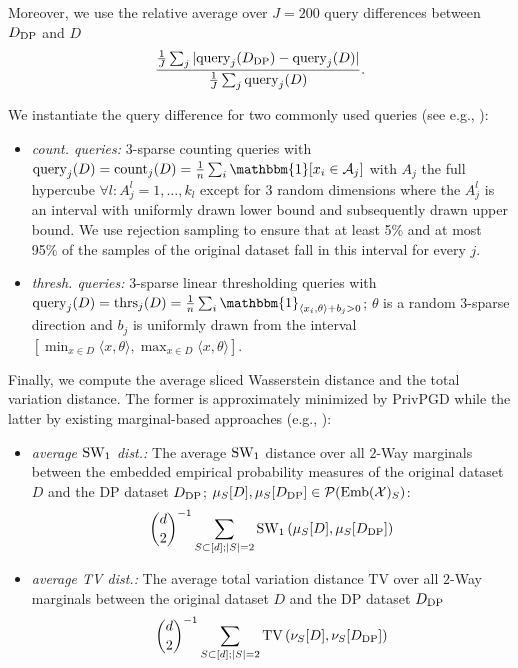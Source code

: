 Moreover, we use the relative average over $J =200$  query differences between $D_{\text{DP}}$ and $D$
    \begin{equation}
    \label{eq:countquery}
      \frac{ \frac{1}{J}\sum_j\vert \text{query}_j(D_{\text{DP}}) - \text{query}_j(D)\vert }{  \frac{1}{J}\sum_j \text{query}_j(D)}.
    \end{equation}
    

We instantiate the query difference 
for two commonly used queries (see e.g., \cite{vietri2022private}):
    \begin{itemize}
        \item[3.] \textit{count. queries:} $3$-sparse counting queries 
with $\text{query}_j(D)= \text{count}_j(D) = \frac{1}{n} \sum_i 
\mathbbm{1}[x_i \in \mathcal A_j] $  with  $A_j$ the full hypercube $\forall l: A_j^l = {1, \dots, k_l}$ except for $3$ random dimensions where the $A_j^l$ is an interval with uniformly drawn lower bound and subsequently drawn upper bound. We use rejection sampling to ensure that at least 5\% and at most 95\% of the samples of the original dataset fall in this interval for every $j$. 
\item[4.] \textit{thresh. queries:}
    $3$-sparse linear thresholding queries 
with $\text{query}_j(D)=\text{thrs}_j(D) = \frac{1}{n} \sum_i  
\mathbbm{1}_{\langle x_i, \theta \rangle + b_j >0} $; $\theta$ is a random $3$-sparse direction and $b_j$ is uniformly drawn from the interval $[\min_{x \in D} \langle x, \theta \rangle,\max_{x \in D} \langle x, \theta \rangle]$.
 \end{itemize}

 Finally, we compute the average sliced Wasserstein distance and the total variation distance. The former is approximately minimized by PrivPGD while the latter by existing marginal-based approaches (e.g., \citep{aim,mst}):
\begin{itemize}
    \item[5.] \emph{average $\text{SW}_1$ dist.:}  
    The average $\text{SW}_1$ distance over all $2$-Way marginals between the embedded empirical probability measures  of the original dataset $D$  and the DP dataset $D_{\text{DP}}$;
    $\mu_S[D], \mu_S[D_{\text{DP}}] \in  \mathcal P(\text{Emb}(\mathcal X)_S)$: 
    \begin{equation}
        {d \choose 2}^{-1} \sum_{S \subset [d]; \vert S \vert =2 } \text{SW}_1 \left( \mu_S[D] , \mu_S[D_{\text{DP}}]\right) 
    \end{equation}
        \item[6.] \emph{average TV dist.:} The average total variation distance $\text{TV}$ over all $2$-Way marginals between the original dataset $D$ and the DP dataset $D_{\text{DP}}$
    \begin{equation}
        {d \choose 2}^{-1} \sum_{S \subset [d]; \vert S \vert =2 } \text{TV}\left( \nu_{S}[D], \nu_{S}[D_{\text{DP}}]\right) 
    \end{equation}
\end{itemize}

